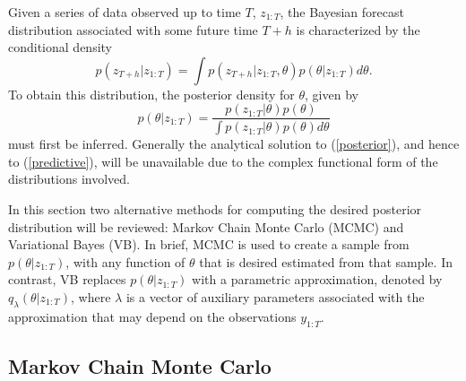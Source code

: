 \documentclass[12pt,a4paper]{article}\usepackage[]{graphicx}\usepackage[]{color}
\begin{document}
Given a series of data observed up to time $T$, $z_{1:T}$, the Bayesian forecast distribution associated with some future time $T+h$ is characterized by the conditional density
\begin{equation}
\label{predictive}
p(z_{T+h} | z_{1:T}) =\int p(z_{T+h}|z_{1:T}, \theta) p(\theta | z_{1:T}) d\theta.
\end{equation}
To obtain this distribution, the posterior density for $\theta$, given by
\begin{equation}
\label{posterior}
 p(\theta | z_{1:T}) = \frac{p(z_{1:T}|\theta)p(\theta)}{\int p(z_{1:T}|\theta)p(\theta) d\theta}
\end{equation}
must first be inferred. Generally the analytical solution to (\ref{posterior}), and hence to (\ref{predictive}), will be unavailable due to the complex functional form of the distributions involved. 

In this section two alternative methods for computing the desired posterior distribution will be reviewed: Markov Chain Monte Carlo (MCMC) and Variational Bayes (VB). In brief, MCMC is used to create a sample from $p(\theta | z_{1:T})$, with any function of $\theta$ that is desired estimated from that sample. In contrast, VB replaces $p(\theta | z_{1:T})$ with a parametric approximation, denoted by $q_{\lambda}(\theta | z_{1:T})$, where $\lambda$ is a vector of auxiliary parameters associated with the approximation that may depend on the observations $y_{1:T}$. 

\subsection{Markov Chain Monte Carlo}
\label{subsec:MCMC}
\end{document}
